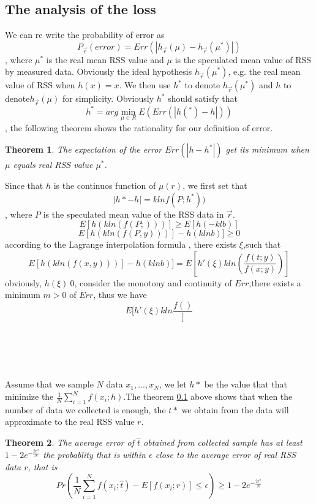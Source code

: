 \documentclass[10pt,conference,compsocconf,letterpaper]{IEEEtran}
\newtheorem{theorem}{Theorem}
\begin{document}
\subsection{The analysis of the loss}
We can re write the probability of error as 
\begin{equation}
P_{\vec r}(error)=Err(|h_{\vec r}(\mu)-h_{\vec r}(\mu^*)|)
\end{equation}
, where $\mu^*$ is the real mean RSS value and $\mu$ is the speculated mean value of RSS by measured data. Obviously the ideal hypothesis $h_{\vec r}(\mu^*)$, e.g. the real mean value of RSS when $h(x)=x$. We then use $h^*$ to denote $h_{\vec r}(\mu^*)$ and $h$ to denote$h_{\vec r}(\mu)$ for simplicity. Obviously $h^*$ should satisfy that 
\begin{equation}
h^*=arg\min_{\mu\in R}E(Err(|h(^*)-h|))
\end{equation}
, the following theorem shows the rationality for our definition of error.
\begin{theorem}
The expectation of the error $Err(|h-h^*|)$ get its minimum when $\mu$ equals real RSS value $\mu^*$. 
\end{theorem}
\begin{IEEEproof}
Since that $h$ is the continuos function of $\mu(r)$, we first set that
\[|h*-h|=klnf(P;h^*))\]
, where $P$ is the speculated mean value of the RSS data in $\vec r$.
\[E[h(kln(f(P;)))]\geq E[h(-klb)] \]
\[E[h(kln(f(P,y)))]-h(klnb)]\geq 0\]
according to the Lagrange interpolation formula , there exists $\xi$,such that
\[E[h(kln(f(x,y)))]-h(klnb)]=E[h'(\xi)kln(\frac{f(t;y)}{f(x;y)})]\]
obviously, $h(\xi)\>0$, consider the monotony and continuity of $Err$,there exists a minimum $m>0$ of $Err$, thus we have
\[E[h'(\xi)kln\frac{f()}]\]
\\
\\
\\
\\
\end{IEEEproof}
Assume that we sample $N$ data $x_1,...,x_N$, we let $h*$ be the value that that minimize the $\frac{1}{N}\sum_{i=1}^N f(x_i;h)$.The theorem \ref{} above shows that when the number of data we collected is enough, the $t*$ we obtain from the data will approximate to the real RSS value $r$. 
\begin{theorem}
The average error of $\hat{t}$ obtained from collected sample has at least $1-2e^{-\frac{2\epsilon^2}{N}}$ the probablity that is within $\epsilon$ close to the average error of real RSS data $r$, that is
\begin{equation}
Pr(\frac{1}{N}\sum_{i=1}^Nf(x_i;\hat{t})-E[f(x_i;r)]\leq\epsilon)\geq1-2e^{-\frac{2\epsilon^2}{N}}
\end{equation}
\end{theorem}
\end{document}

